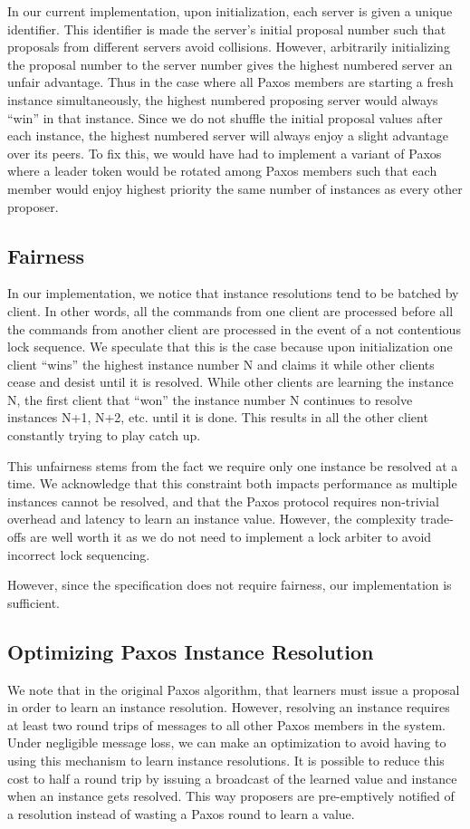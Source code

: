 \documentclass{article}
\begin{document}
In our current implementation, upon initialization, each server is given a unique identifier.
This identifier is made the server's initial proposal number such that proposals from different servers avoid collisions.
However, arbitrarily initializing the proposal number to the server number gives the highest numbered server an unfair advantage.
Thus in the case where all Paxos members are starting a fresh instance simultaneously, the highest numbered proposing server would always ``win'' in that instance.
Since we do not shuffle the initial proposal values after each instance, the highest numbered server will always enjoy a slight advantage over its peers.
To fix this, we would have had to implement a variant of Paxos where a leader token would be rotated among Paxos members such that each member would enjoy highest priority the same number of instances as every other proposer.

\subsection{Fairness}

In our implementation, we notice that instance resolutions tend to be batched by client. In other words, all the commands from one client are processed before all the commands from another client are processed in the event of a not contentious lock sequence. We speculate that this is the case because upon initialization one client ``wins'' the highest instance number N and claims it while other clients cease and desist until it is resolved. While other clients are learning the instance N, the first client that ``won'' the instance number N continues to resolve instances N+1, N+2, etc. until it is done. This results in all the other client constantly trying to play catch up.

This unfairness stems from the fact we require only one instance be resolved at a time. We acknowledge that this constraint both impacts performance as multiple instances cannot be resolved, and that the Paxos protocol requires non-trivial overhead and latency to learn an instance value. However, the complexity trade-offs are well worth it as we do not need to implement a lock arbiter to avoid incorrect lock sequencing.

However, since the specification does not require fairness, our implementation is sufficient.

\subsection{Optimizing Paxos Instance Resolution}

We note that in the original Paxos algorithm, that learners must issue a proposal in order to learn an instance resolution.
However, resolving an instance requires at least two round trips of messages to all other Paxos members in the system.
Under negligible message loss, we can make an optimization to avoid having to using this mechanism to learn instance resolutions.
It is possible to reduce this cost to half a round trip by issuing a broadcast of the learned value and instance when an instance gets resolved.
This way proposers are pre-emptively notified of a resolution instead of wasting a Paxos round to learn a value.
\end{document}
